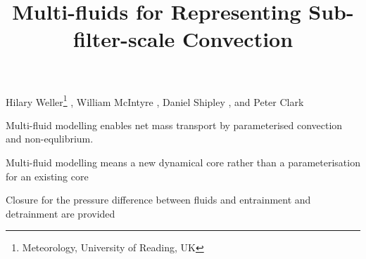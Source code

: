 \documentclass[draft]{agujournal2019}
\begin{document}
\title{Multi-fluids for Representing Sub-filter-scale Convection}

\authors
{
    Hilary Weller\thanks{Meteorology, University of Reading, UK}
    ,
    William McIntyre
    ,
    Daniel Shipley
    , and 
    Peter Clark
}



\begin{keypoints}
\item Multi-fluid modelling enables net mass transport by parameterised convection and non-equlibrium.
\item Multi-fluid modelling means a new dynamical core rather than a parameterisation for an existing core
\item Closure for the pressure difference between fluids and entrainment and detrainment are provided
\end{keypoints}
\end{document}
